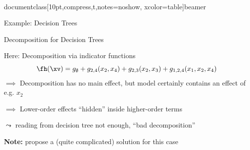 \\documentclass[10pt,compress,t,notes=noshow, xcolor=table]{beamer}
\begin{document}
\begin{frame}{Example: Decision Trees}
{\begin{center}
\end{center}
}

    
\end{frame}

\begin{frame}{Decomposition for Decision Trees}
    

Here: Decomposition via indicator functions
$$
\fh(\xv) = g_\emptyset + g_{2,4}(x_2, x_4) + g_{2,3}(x_2, x_3) + g_{1, 2, 4}(x_1, x_2, x_4)
$$
$\implies$ Decomposition has no main effect, but model certainly contains an effect of e.g. $x_2$

$\implies$ Lower-order effects ``hidden'' inside higher-order terms

$\leadsto$ reading from decision tree not enough, ``bad decomposition''



\pause
\textbf{Note:} %
 propose a (quite complicated) solution for this case

\end{frame}
\end{document}
